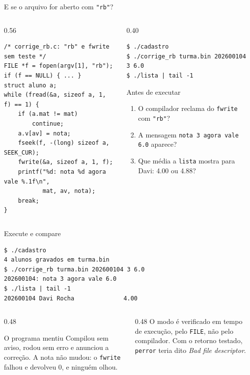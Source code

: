 \documentclass[aspectratio=169]{beamer}
\begin{document}
\begin{frame}[fragile]{E se o arquivo for aberto com \texttt{"rb"}?}
  \vspace{-0.6em}
  \begin{columns}[T]
    \begin{column}{0.56\textwidth}
\begin{lstlisting}[style=codCs]
/* corrige_rb.c: "rb" e fwrite sem teste */
FILE *f = fopen(argv[1], "rb");
if (f == NULL) { ... }
struct aluno a;
while (fread(&a, sizeof a, 1, f) == 1) {
    if (a.mat != mat)
        continue;
    a.v[av] = nota;
    fseek(f, -(long) sizeof a, SEEK_CUR);
    fwrite(&a, sizeof a, 1, f);
    printf("%d: nota %d agora vale %.1f\n",
           mat, av, nota);
    break;
}
\end{lstlisting}
    \end{column}
    \begin{column}{0.40\textwidth}
\begin{lstlisting}[style=shellS]
$ ./cadastro
$ ./corrige_rb turma.bin 202600104 3 6.0
$ ./lista | tail -1
\end{lstlisting}
      \begin{block}{Antes de executar}
        \small
        \begin{enumerate}
          \item O compilador reclama do \texttt{fwrite} com \texttt{"rb"}?
          \item A mensagem \texttt{nota 3 agora vale 6.0} aparece?
          \item Que média a \texttt{lista} mostra para Davi: 4.00 ou 4.88?
        \end{enumerate}
      \end{block}
    \end{column}
  \end{columns}
\end{frame}

\begin{frame}[fragile]{Execute e compare}
\begin{lstlisting}[style=shellStyle]
$ ./cadastro
4 alunos gravados em turma.bin
$ ./corrige_rb turma.bin 202600104 3 6.0
202600104: nota 3 agora vale 6.0
$ ./lista | tail -1
202600104 Davi Rocha              4.00
\end{lstlisting}
  \begin{columns}[T]
    \begin{column}{0.48\textwidth}
      \begin{block}{O programa mentiu}
        \small Compilou sem aviso, rodou sem erro e anunciou a correção. A
        nota não mudou: o \texttt{fwrite} falhou e devolveu 0, e ninguém
        olhou.
      \end{block}
    \end{column}
    \begin{column}{0.48\textwidth}
      \small O modo é verificado em tempo de execução, pelo \texttt{FILE},
      não pelo compilador. Com o retorno testado, \texttt{perror} teria
      dito \emph{Bad file descriptor}.
    \end{column}
  \end{columns}
\end{frame}
\end{document}
